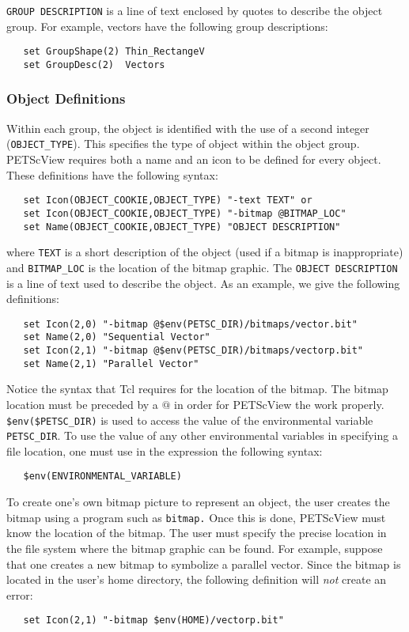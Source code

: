 {\tt GROUP DESCRIPTION} is a line of text enclosed by quotes to describe the object group.  For example, vectors have the following group descriptions:
\begin{verbatim}
   set GroupShape(2) Thin_RectangeV 
   set GroupDesc(2)  Vectors
\end{verbatim}

\subsubsection{Object Definitions}

Within each group, the object is identified with the use of a second integer ({\tt OBJECT\_TYPE}).  This specifies the type of object within the object group.  PETScView requires both a name and an icon to be defined for every object.  These definitions have the following syntax:
\begin{verbatim}
   set Icon(OBJECT_COOKIE,OBJECT_TYPE) "-text TEXT" or 
   set Icon(OBJECT_COOKIE,OBJECT_TYPE) "-bitmap @BITMAP_LOC"
   set Name(OBJECT_COOKIE,OBJECT_TYPE) "OBJECT DESCRIPTION"
\end{verbatim}
where {\tt TEXT} is a short description of the object (used if a bitmap is inappropriate) and {\tt BITMAP\_LOC} is the location of the bitmap graphic.  The {\tt OBJECT DESCRIPTION} is a line of text used to describe the object.  As an example, we give the following definitions:
\begin{verbatim}
   set Icon(2,0) "-bitmap @$env(PETSC_DIR)/bitmaps/vector.bit" 
   set Name(2,0) "Sequential Vector" 
   set Icon(2,1) "-bitmap @$env(PETSC_DIR)/bitmaps/vectorp.bit" 
   set Name(2,1) "Parallel Vector"
\end{verbatim}
Notice the syntax that Tcl requires for the location of the bitmap.
The bitmap location must be preceded by a $@$ in order for PETScView
the work properly.  {\tt \$env(\$PETSC\_DIR)} is used to access the
value of the environmental variable {\tt PETSC\_DIR}.  To use the
value of any other environmental variables in specifying a file
location, one must use in the expression the following syntax:
\begin{verbatim}
   $env(ENVIRONMENTAL_VARIABLE)
\end{verbatim}

To create one's own bitmap picture to represent an
object, the user creates the bitmap using a program such as {\tt bitmap.}
Once this is done, PETScView must know the location of the
bitmap.  The user must specify the precise location in
the file system where the bitmap graphic can be found.  For example,
suppose that one creates a new bitmap to symbolize a parallel vector.
Since the bitmap is located in the user's home directory, the
following definition will {\em not} create an error:
\begin{verbatim}
   set Icon(2,1) "-bitmap $env(HOME)/vectorp.bit"
\end{verbatim}

